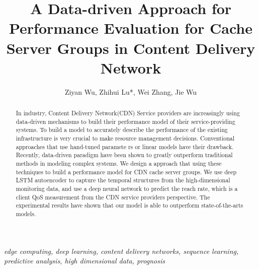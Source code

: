 \documentclass[5p]{elsarticle}
\newcommand{\dabiaolv}{reach rate}
\begin{document}
\begin{frontmatter}

\title{A Data-driven Approach for Performance Evaluation for Cache Server Groups in Content Delivery Network
    }

\author{Ziyan Wu, Zhihui Lu*, Wei Zhang, Jie Wu
    }
\address{School of Computer Science, Fudan University, Shanghai 200433, China}


\begin{abstract}
In industry, Content Delivery Network(CDN) Service providers are increasingly using data-driven mechanisms to build their performance model of their service-providing systems. To build a model to accurately describe the performance of the existing infrastructure is very crucial to make resource management decisions. Conventional approaches that use hand-tuned paramete  rs or linear models have their drawback. Recently, data-driven paradigm have been shown to greatly outperform traditional methods in modeling complex systems. We design a approach that using these techniques to build a performance model for CDN cache server groups. We use deep LSTM autoencoder to capture the temporal structures from the high-dimensional monitoring data, and use a deep neural network to predict the \dabiaolv, which is a client QoS measurement from the CDN service providers perspective. The experimental results have shown that our model is able to outperform state-of-the-arts models.
\end{abstract}
\begin{keyword}
\textit{edge computing, deep learning, content delivery networks, sequence learning, predictive analysis, high dimensional data, prognosis}
\end{keyword}
\end{frontmatter}
\linenumbers
\end{document}
